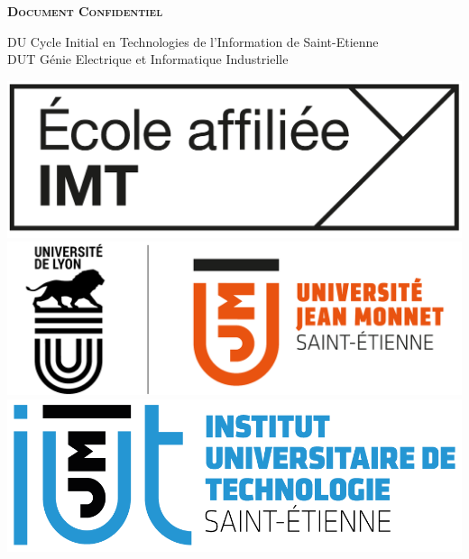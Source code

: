 \begin{titlepage}
\begin{center}
    \end{center}

    \begin{center}
        \large{\textbf{\textsc{Document Confidentiel}}}
    \end{center}

    \begin{flushleft}
        \hspace{0.45cm} DU Cycle Initial en Technologies de l'Information de Saint-Etienne\\
        \hspace{0.45cm} DUT Génie Electrique et Informatique Industrielle\\[0.7cm]
    \end{flushleft}
    
    \hfill

    \includegraphics[scale=0.09]{image/IMT_Affiliee_logo_Noir.png}
    \includegraphics[scale=0.22]{image/Logo_UJM.png}
	\includegraphics[scale=0.5]{image/IUT-Bleu.png}

\end{titlepage}